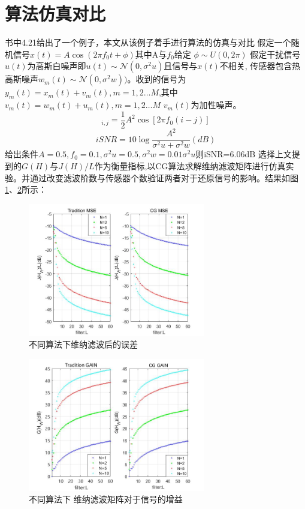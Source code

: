 \section{算法仿真对比}
书中4.21给出了一个例子，本文从该例子着手进行算法的仿真与对比
假定一个随机信号$x(t)=A\cos(2\pi f_0t+\phi )$其中A与$f_0$给定
$ \phi \sim U(0,2\pi )$
假定干扰信号$u(t)$为高斯白噪声即$u(t) \sim \mathcal N(0,{\sigma^2 u})$且信号与$x(t)$不相关,
传感器包含热高斯噪声$w_m(t) \sim \mathcal N(0,\sigma^2 w))$。收到的信号为	$y_m(t)=x_m(t)+v_m(t),m=1,2\ldots M $,其中 $v_m(t)=w_m(t)+u_m(t),m=1,2\ldots M $
$v_m(t)$为加性噪声。 
\begin{equation}
	[R_{x_1}]_{i,j}=\frac{1}{2}A^2\cos[2\pi f_0(i-j)]
\end{equation}
\begin{equation}
	iSNR=10\log\frac{A^2}{\sigma^2 u+\sigma^2 w}(dB)
\end{equation}
给出条件$A=0.5,f_0=0.1,\sigma^2 u=0.5,\sigma^2 w=0.01\sigma^2 u$则iSNR=6.06dB
选择上文提到的$G(H)$与$J(H)/L$作为衡量指标,以CG算法求解维纳滤波矩阵进行仿真实验。并通过改变滤波阶数与传感器个数验证两者对于还原信号的影响。结果如图\ref{333}、\ref{444}所示：
\begin{figure}[ht]
	\centering
	\includegraphics[width=\linewidth,height=5.82cm]{pic/gain.jpg}
	\caption{不同算法下维纳滤波后的误差}
	\label{333}
\end{figure}
\begin{figure}[ht]
	\centering
	\includegraphics[width=\linewidth,height=5.82cm]{pic/mse.jpg}
	\caption{不同算法下 维纳滤波矩阵对于信号的增益}
	\label{444}
\end{figure}

